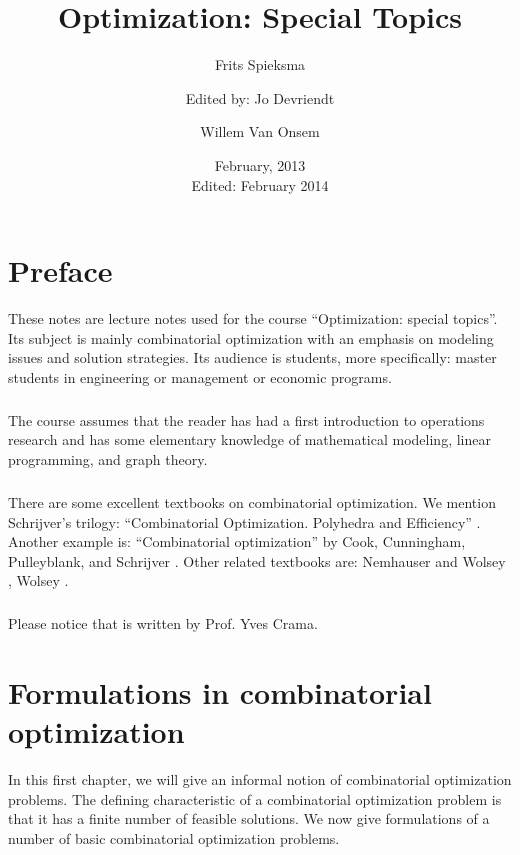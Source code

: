 \documentclass[titlepage]{book}
\title{Optimization: Special Topics}
\author{Frits Spieksma\and Edited by: Jo Devriendt \and Willem Van Onsem}
\date{February, 2013\\Edited: February 2014}
\theoremstyle{plain}
\theoremstyle{definition}
\theoremstyle{remark}
\begin{document}
\begin{titlepage}
\maketitle
\end{titlepage}
\tableofcontents
\chapter*{Preface}
These notes are lecture notes used for the course ``Optimization: special topics''. Its subject is mainly combinatorial optimization with an emphasis on modeling issues and solution strategies. Its audience is students, more specifically: master students in engineering or management or economic programs.

\paragraph{}
The course assumes that the reader has had a first introduction to operations research and has some elementary knowledge of mathematical modeling, linear programming, and graph theory.

\paragraph{}
There are some excellent textbooks on combinatorial optimization. We mention Schrijver's trilogy: ``Combinatorial Optimization. Polyhedra and Efficiency'' \cite{schrijver-book}. Another example is: ``Combinatorial optimization'' by Cook, Cunningham, Pulleyblank, and Schrijver \cite{Cook:98}. Other related textbooks are: Nemhauser and Wolsey \cite{citeulike:2212037}, Wolsey \cite{wolseyip}.

\paragraph{}
Please notice that \chpref{} is written by Prof. Yves Crama.

\chapter{Formulations in combinatorial optimization}
In this first chapter, we will give an informal notion of combinatorial optimization problems. The defining characteristic of a combinatorial optimization problem is that it has a finite number of feasible solutions. We now give formulations of a number of basic combinatorial optimization problems.
\end{document}
